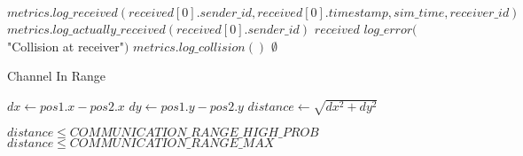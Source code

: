 \documentclass{article}
\begin{document}
\begin{algorithm}
\begin{algorithmic}[1]
            \State $metrics.log\_received(received[0].sender\_id, received[0].timestamp, sim\_time, receiver\_id)$
            \State $metrics.log\_actually\_received(received[0].sender\_id)$
        \EndIf
        \State \Return $received$
    \Else
        \State $log\_error($"Collision at receiver"$)$
                \State $metrics.log\_collision()$
            \EndFor
        \EndIf
        \State \Return $\emptyset$ 
    \EndIf
\EndProcedure
\end{algorithmic}
\end{algorithm}

\begin{algorithm}
\caption{Channel In Range}
\begin{algorithmic}[1]
    \State $dx \gets pos1.x - pos2.x$
    \State $dy \gets pos1.y - pos2.y$
    \State $distance \gets \sqrt{dx^2 + dy^2}$
    
        \State \Return $distance \leq COMMUNICATION\_RANGE\_HIGH\_PROB$
    \Else
        \State \Return $distance \leq COMMUNICATION\_RANGE\_MAX$
    \EndIf
\EndProcedure
\end{algorithmic}
\end{algorithm}
\end{document}

